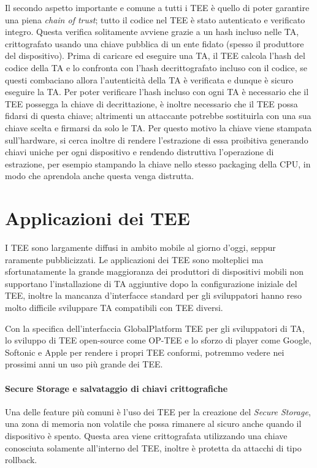 \documentclass[12pt,italian]{report}
\begin{document}
Il secondo aspetto importante e comune a tutti i TEE è quello di poter
garantire una piena \textit{chain of trust}; tutto il codice nel TEE è stato
autenticato e verificato integro.
Questa verifica solitamente avviene grazie a un hash incluso nelle TA,
crittografato usando una chiave pubblica di un ente fidato (spesso il
produttore del dispositivo).
Prima di caricare ed eseguire una TA, il TEE calcola l'hash del codice della TA
e lo confronta con l'hash decrittografato incluso con il codice, se questi
combaciano allora l'autenticità della TA è verificata e dunque è sicuro eseguire
la TA.
Per poter verificare l'hash incluso con ogni TA è necessario che il TEE
possegga la chiave di decrittazione, è inoltre necessario che il TEE possa
fidarsi di questa chiave; altrimenti un attaccante potrebbe sostituirla con
una sua chiave scelta e firmarsi da solo le TA.
Per questo motivo la chiave viene stampata sull'hardware, si cerca inoltre
di rendere l'estrazione di essa proibitiva generando chiavi uniche per
ogni dispositivo e rendendo distruttiva l'operazione di estrazione, 
per esempio stampando la chiave nello stesso packaging della CPU, in modo
che aprendola anche questa venga distrutta.

\section{Applicazioni dei TEE}
\label{sec:applicazioni-tee}
I TEE sono largamente diffusi in ambito mobile al giorno d'oggi, seppur
raramente pubblicizzati.
Le applicazioni dei TEE sono molteplici ma sfortunatamente la grande
maggioranza dei produttori di dispositivi mobili non supportano l'installazione di
TA aggiuntive dopo la configurazione iniziale del TEE, inoltre la mancanza
d'interfacce standard per gli sviluppatori hanno reso molto difficile
sviluppare TA compatibili con TEE diversi.

Con la specifica dell'interfaccia GlobalPlatform TEE per gli sviluppatori di
TA, lo sviluppo di TEE open-source come OP-TEE e lo sforzo di player come
Google, Softonic e Apple per rendere i propri TEE conformi, potremmo vedere
nei prossimi anni un uso più grande dei TEE.

\paragraph{Secure Storage e salvataggio di chiavi crittografiche}

Una delle feature più comuni è l'uso dei TEE per la creazione del
\textit{Secure Storage}, una zona di memoria non volatile che possa rimanere
al sicuro anche quando il dispositivo è spento.
Questa area viene crittografata utilizzando una chiave conosciuta solamente
all'interno del TEE, inoltre è protetta da attacchi di tipo rollback.
\end{document}
